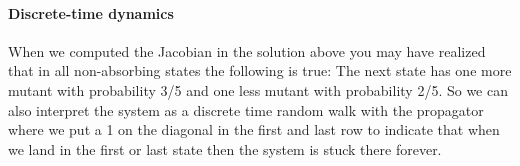 \paragraph{Discrete-time dynamics}  When we computed the Jacobian in the solution above you may have realized that in all non-absorbing states the following is true: The next state has one more mutant with probability 3/5 and one less mutant with probability 2/5. So we can also interpret the system as a discrete time random walk with the propagator 
where we put a 1 on the diagonal in the first and last row to indicate that when we land in the first or last state then the 
system is stuck there forever. 

